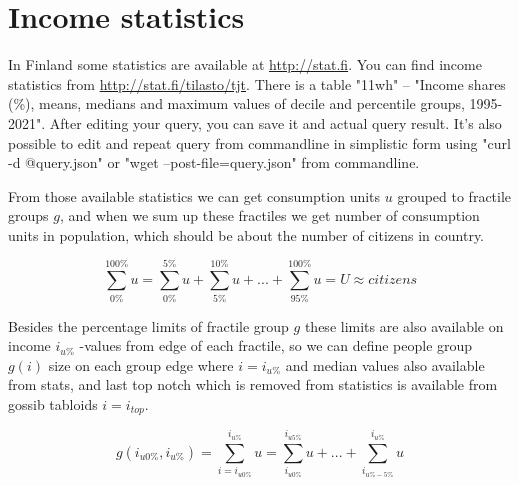 %
%
%

\chapter{Income statistics}
\label{statistics}
In Finland some statistics are available at \url{http://stat.fi}.
You can find income statistics from \url{http://stat.fi/tilasto/tjt}.
There is a table "11wh" -- "Income shares (\%),
means, medians and maximum values of decile and percentile groups, 1995-2021".
After editing your query, you can save it and actual query result.
It's also possible to edit and repeat query from commandline in simplistic form
using "curl -d @query.json" or "wget --post-file=query.json" from commandline.

From those available statistics we can get consumption units
$u$ grou\-ped to fractile groups $g$,
and when we sum up these fractiles we get number of consumption
units\cite{ConsumptionUnitD}
in population, which should be about the number of citizens in country.  

\begin{equation} \label{eq:fractile_units_sum}
	\sum_{0\%}^{100\%} u =
	\sum_{0\%}^{5\%} u +
	\sum_{5\%}^{10\%} u +
	...+
	\sum_{95\%}^{100\%} u = U \approx citizens
\end{equation}

Besides the percentage limits of fractile group $g$
these limits are also available on income $i_{u\%}$ -values from edge of each fractile,
so we can define people group $g(i)$ size on each group edge where
$i=i_{u\%}$ and median values also available from stats,
and last top notch which is removed from statistics is available from gossib tabloids
$i=i_{top}$.

\begin{equation} \label{eq:fractile_units_group}
	g(i_{u0\%},i_{u\%})=
        \sum_{i=i_{u0\%}}^{i_{u\%}} u =
	\sum_{i_{u0\%}}^{i_{u5\%}} u+
	...+
	\sum_{i_{u\%-5\%}}^{i_{u\%}} u
\end{equation}

